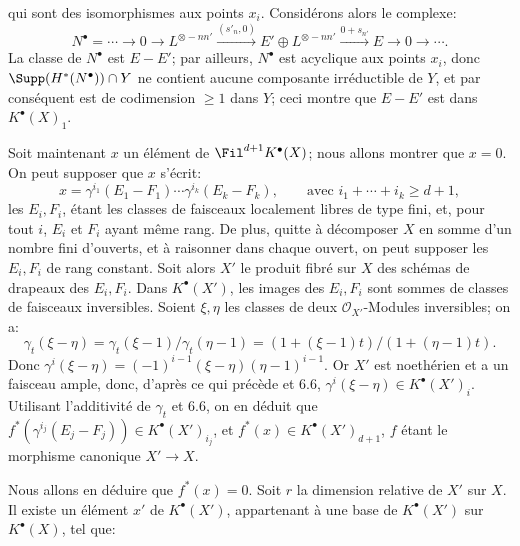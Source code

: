 qui
sont des isomorphismes aux points $x_i$. Considérons alors le complexe:
\[
  N^\bullet=\cdots\to0\to L^{\otimes -nn'}
    \xrightarrow{(s'_n,0)} E'\oplus L^{\otimes -nn'}
    \xrightarrow{0+s_{n'}} E\to0\to\cdots.
\]
La classe de $N^\bullet$ est $E-E'$; par ailleurs, $N^\bullet$ est acyclique aux points $x_i$, donc $\Supp(H^*(N^\bullet))\cap Y$ ne contient aucune composante irréductible de $Y$, et par conséquent est de codimension $\ge1$ dans $Y$; ceci montre que $E-E'$ est dans $K^{\bullet}(X)_1$.

Soit maintenant $x$ un élément de $\Fil^{d+1}K^{\bullet}(X)$; nous allons montrer que $x=0$. On peut supposer que $x$ s'écrit:
\[
  x=\gamma^{i_1}(E_1-F_1)\cdots\gamma^{i_k}(E_k-F_k),
  \qquad\text{avec } i_1+\cdots+i_k\ge d+1,
\]
les $E_i,F_i$, étant les classes de faisceaux localement libres de type fini, et, pour tout $i$, $E_i$ et $F_i$ ayant même rang. De plus, quitte à décomposer $X$ en somme d'un nombre fini d'ouverts, et à raisonner dans chaque ouvert, on peut supposer les $E_i,F_i$ de rang constant. Soit alors $X'$ le produit fibré sur $X$ des schémas de drapeaux des $E_i,F_i$. Dans $K^{\bullet}(X')$, les images des $E_i,F_i$ sont sommes de classes de faisceaux inversibles. Soient $\xi,\eta$ les classes de deux $\mathcal O_{X'}$-Modules inversibles; on a:
\[
  \gamma_t(\xi-\eta)=\gamma_t(\xi-1)/\gamma_t(\eta-1)
  =(1+(\xi-1)t)/(1+(\eta-1)t).
\]
Donc $\gamma^i(\xi-\eta)=(-1)^{i-1}(\xi-\eta)(\eta-1)^{i-1}$. Or $X'$ est noethérien et a un faisceau ample, donc, d'après ce qui précède et 6.6, $\gamma^i(\xi-\eta)\in K^{\bullet}(X')_i$. Utilisant l'additivité de $\gamma_t$ et 6.6, on en déduit que $f^*(\gamma^{i_j}(E_j-F_j))\in K^{\bullet}(X')_{i_j}$, et $f^*(x)\in K^{\bullet}(X')_{d+1}$, $f$ étant le morphisme canonique $X'\to X$.

Nous allons en déduire que $f^*(x)=0$. Soit $r$ la dimension relative de $X'$ sur $X$. Il existe un élément $x'$ de $K^{\bullet}(X')$, appartenant à une base de $K^{\bullet}(X')$ sur $K^{\bullet}(X)$, tel que:
